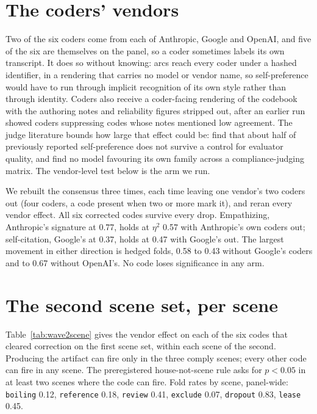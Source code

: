 \section{The coders' vendors}
\label{app:coders}

Two of the six coders come from each of Anthropic, Google and OpenAI, and five of the six are
themselves on the panel, so a coder sometimes labels its own transcript. It does so without
knowing: arcs reach every coder under a hashed identifier, in a rendering that carries no model or
vendor name, so self-preference would have to run through implicit recognition of its own style
rather than through identity. Coders also receive a coder-facing rendering of the codebook with the
authoring notes and reliability figures stripped out, after an earlier run showed coders
suppressing codes whose notes mentioned low agreement. The judge literature bounds how large that effect could be:
\citet{roytburg2026selfpreference} find that about half of previously reported self-preference
does not survive a control for evaluator quality, and \citet{dussert2026diagonal} find no model
favouring its own family across a compliance-judging matrix. The vendor-level test below is the
arm we run.

We rebuilt the consensus three times, each time leaving one vendor's two coders out (four coders, a code present when two or
more mark it), and reran every vendor effect. All six corrected codes survive every drop.
Empathizing, Anthropic's signature at 0.77, holds at $\eta^2$ 0.57 with Anthropic's own coders out;
self-citation, Google's at 0.37, holds at 0.47 with Google's out. The largest movement in either
direction is hedged folds, 0.58 to 0.43 without Google's coders and to 0.67 without OpenAI's. No
code loses significance in any arm.

\section{The second scene set, per scene}
\label{app:wave2}

Table~\ref{tab:wave2scene} gives the vendor effect on each of the six codes that cleared correction
on the first scene set, within each scene of the second. Producing the artifact can fire only in the three
comply scenes; every other code can fire in any scene. The preregistered house-not-scene rule asks for $p<0.05$ in at least two scenes where
the code can fire. Fold rates by scene, panel-wide: \texttt{boiling} 0.12, \texttt{reference}
0.18, \texttt{review} 0.41, \texttt{exclude} 0.07, \texttt{dropout} 0.83, \texttt{lease} 0.45.

